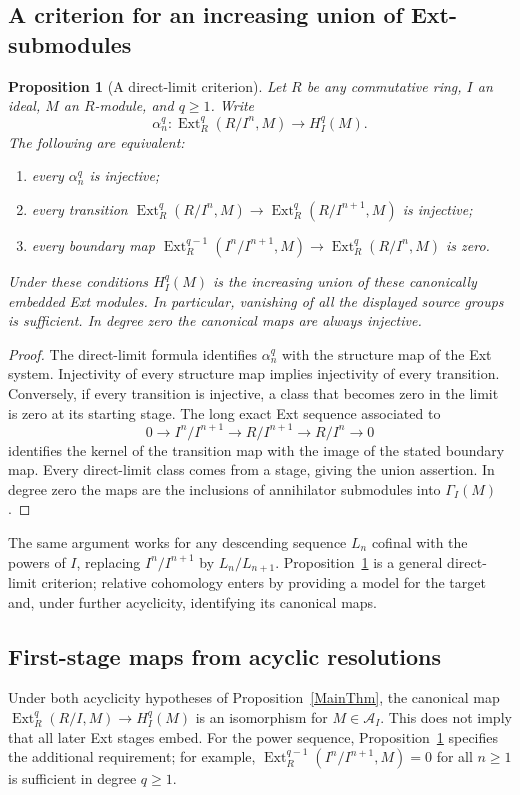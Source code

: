 \documentclass[11pt,reqno]{amsart}
\newtheorem{proposition}[theorem]{Proposition}
\theoremstyle{definition}
\theoremstyle{remark}
\newcommand{\Ext}{\operatorname{Ext}}
\newcommand{\A}{\mathcal A_I}
\begin{document}
\subsection{A criterion for an increasing union of Ext-submodules}
\begin{proposition}[A direct-limit criterion]\label{thm:union}
Let $R$ be any commutative ring, $I$ an ideal, $M$ an $R$-module, and $q\geq1$. Write
\[
\alpha_n^q:\Ext_R^q(R/I^n,M)\to H_I^q(M).
\]
The following are equivalent:
\begin{enumerate}[label=(\roman*)]
\item every $\alpha_n^q$ is injective;
\item every transition $\Ext_R^q(R/I^n,M)\to\Ext_R^q(R/I^{n+1},M)$ is injective;
\item every boundary map
$\Ext_R^{q-1}(I^n/I^{n+1},M)\to\Ext_R^q(R/I^n,M)$ is zero.
\end{enumerate}
Under these conditions $H_I^q(M)$ is the increasing union of these canonically embedded Ext modules. In particular, vanishing of all the displayed source groups is sufficient. In degree zero the canonical maps are always injective.
\end{proposition}
\begin{proof}
The direct-limit formula identifies $\alpha_n^q$ with the structure map of the Ext system. Injectivity of every structure map implies injectivity of every transition. Conversely, if every transition is injective, a class that becomes zero in the limit is zero at its starting stage. The long exact Ext sequence associated to
\[
0\to I^n/I^{n+1}\to R/I^{n+1}\to R/I^n\to0
\]
identifies the kernel of the transition map with the image of the stated boundary map. Every direct-limit class comes from a stage, giving the union assertion. In degree zero the maps are the inclusions of annihilator submodules into $\Gamma_I(M)$.
\end{proof}

The same argument works for any descending sequence $L_n$ cofinal with the powers of $I$, replacing $I^n/I^{n+1}$ by $L_n/L_{n+1}$. Proposition~\ref{thm:union} is a general direct-limit criterion; relative cohomology enters by providing a model for the target and, under further acyclicity, identifying its canonical maps.

\subsection{First-stage maps from acyclic resolutions}
Under both acyclicity hypotheses of Proposition~\ref{MainThm}, the canonical map $\Ext_R^q(R/I,M)\to H_I^q(M)$ is an isomorphism for $M\in\A$. This does not imply that all later Ext stages embed. For the power sequence, Proposition~\ref{thm:union} specifies the additional requirement; for example, $\Ext_R^{q-1}(I^n/I^{n+1},M)=0$ for all $n\geq1$ is sufficient in degree $q\geq1$.
\end{document}
